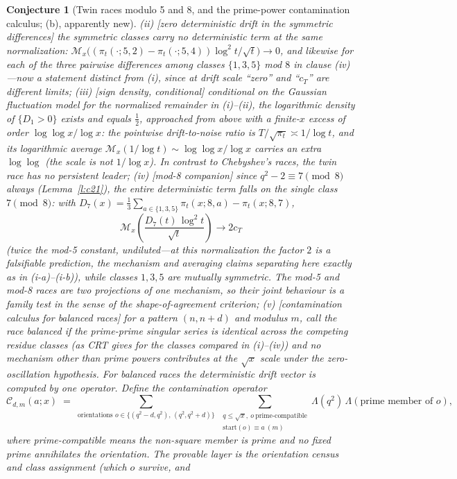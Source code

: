 \documentclass[11pt]{article}
\newtheorem{conjecture}{Conjecture}
\theoremstyle{definition}
\newcommand{\M}{\mathcal M}
\begin{document}
\begin{conjecture}[Twin races modulo 5 and 8, and the prime-power
contamination calculus; (b), apparently new]
\emph{(ii)} [zero deterministic drift in the symmetric differences]
the symmetric classes carry no deterministic term \emph{at the same
normalization}:
$\M_x\bigl((\pi_t(\cdot;5,2)-\pi_t(\cdot;5,4))\log^2t/\sqrt
t\bigr)\to0$,
and likewise for each of the three pairwise differences among classes
$\{1,3,5\}$ mod $8$ in clause (iv)---now a statement distinct from (i),
since at drift scale ``zero'' and ``$c_T$'' are
different limits;
\emph{(iii)} [sign density, conditional] conditional on the Gaussian
fluctuation model for the normalized remainder in (i)--(ii), the
logarithmic density of $\{D_1>0\}$ exists and equals $\tfrac12$,
approached from above with a finite-$x$ excess of order
$\log\log x/\log x$: the pointwise drift-to-noise ratio is
$T/\sqrt{\pi_t}\asymp1/\log t$, and its \emph{logarithmic average}
$\M_x(1/\log t)\sim\log\log x/\log x$ carries an extra $\log\log$
(the scale is not $1/\log x$).  In contrast to Chebyshev's races, the twin
race has no
persistent leader;
\emph{(iv)} [mod-8 companion] since $q^2-2\equiv7\pmod8$ always
(Lemma~\ref{l:c21}), the \emph{entire} deterministic term falls on
the single class $7\pmod 8$: with
$D_7(x)=\tfrac13\sum_{a\in\{1,3,5\}}\pi_t(x;8,a)-\pi_t(x;8,7)$,
\[
\M_x\!\left(\frac{D_7(t)\,\log^2t}{\sqrt t}\right)
\longrightarrow2c_T
\]
(twice the mod-5 constant, undiluted---at this normalization the factor $2$
is a falsifiable prediction, the mechanism and averaging claims
separating here exactly as in (i-a)--(i-b)), while classes $1,3,5$
are mutually symmetric.  The mod-5 and mod-8 races are two projections of one
mechanism, so their joint behaviour is a family test in the sense of
the shape-of-agreement criterion;
\emph{(v)} [contamination calculus for balanced races] for a pattern
$(n,n+d)$ and modulus $m$, call the race \emph{balanced} if the
prime-prime singular series is identical across the competing residue
classes (as CRT gives for the classes compared in (i)--(iv)) and no
mechanism other than prime powers contributes at the $\sqrt x$ scale
under the zero-oscillation hypothesis.  For balanced races the
deterministic drift vector is computed by one operator.  Define the
\emph{contamination operator}
\[
\mathcal C_{d,m}(a;x)\;=\;
\sum_{\text{orientations }o\in\{(q^2-d,q^2),\,(q^2,q^2+d)\}}
\ \sum_{\substack{q\le\sqrt x,\ o\ \text{prime-compatible}\\
\mathrm{start}(o)\equiv a\ (m)}}
\Lambda(q^2)\,\Lambda(\text{prime member of }o),
\]
where prime-compatible means the non-square member is prime and no
fixed prime annihilates the orientation.  The provable layer is the
orientation census and class assignment (which $o$ survive, and

\end{conjecture}
\end{document}
